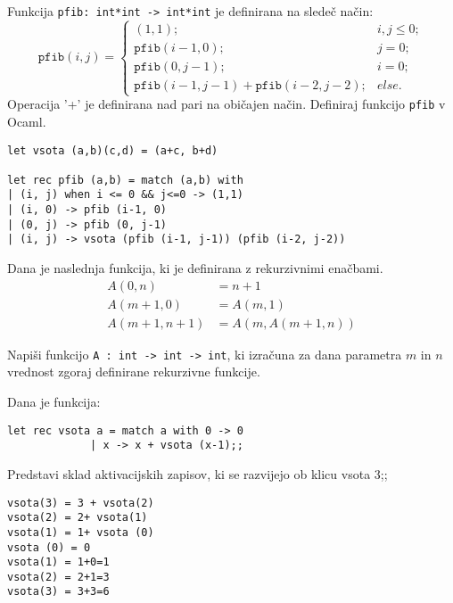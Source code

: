 \begin{ex}
Funkcija \lstinline{pfib: int*int -> int*int} je definirana na slede\v c na\v cin:
$$
\mathtt{pfib}(i,j)=\begin{cases}
(1,1); & i,j\le0;\\
\mathtt{pfib}(i-1,0); & j=0;\\
\mathtt{pfib}(0,j-1); & i=0;\\
\mathtt{pfib}(i-1,j-1)+\mathtt{pfib}(i-2,j-2); & else.
\end{cases}
$$
Operacija '+' je definirana nad pari na obi\v cajen na\v cin. Definiraj funkcijo \lstinline{pfib} v Ocaml.

\begin{sol}
\begin{lstlisting}
let vsota (a,b)(c,d) = (a+c, b+d)

let rec pfib (a,b) = match (a,b) with
| (i, j) when i <= 0 && j<=0 -> (1,1)
| (i, 0) -> pfib (i-1, 0)
| (0, j) -> pfib (0, j-1)
| (i, j) -> vsota (pfib (i-1, j-1)) (pfib (i-2, j-2))    
\end{lstlisting}
\end{sol}



\end{ex}
\begin{ex}
Dana je naslednja funkcija, ki je definirana z rekurzivnimi ena\v cbami.
\begin{align*}
A(0, n) &= n+1 \\
A(m + 1, 0) &= A(m, 1) \\ 
A(m + 1, n + 1) &= A(m, A(m + 1, n)) 
\end{align*}

Napi\v si funkcijo \lstinline{A : int -> int -> int}, ki izra\v cuna za dana parametra $m$ in $n$ vrednost zgoraj definirane rekurzivne funkcije.
\end{ex}
\begin{ex}
Dana je funkcija:
\begin{lstlisting}
let rec vsota a = match a with 0 -> 0 
             | x -> x + vsota (x-1);;
\end{lstlisting}

Predstavi sklad aktivacijskih zapisov, ki se razvijejo ob klicu vsota 3;;

\begin{sol}
\begin{lstlisting}
vsota(3) = 3 + vsota(2)
vsota(2) = 2+ vsota(1)
vsota(1) = 1+ vsota (0)
vsota (0) = 0
vsota(1) = 1+0=1
vsota(2) = 2+1=3
vsota(3) = 3+3=6
\end{lstlisting}
\end{sol}

\end{ex}
